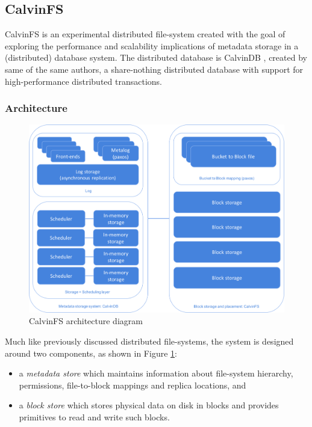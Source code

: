 \subsection{CalvinFS}
CalvinFS \cite{DBLP:conf/fast/ThomsonA15} is an experimental distributed file-system created with the goal of exploring the performance and scalability implications of metadata storage in a (distributed) database system.
The distributed database is CalvinDB \cite{DBLP:conf/sigmod/ThomsonDWRSA12}, created by same of the same authors, a share-nothing distributed database with support for high-performance distributed transactions.

\subsubsection{Architecture}
\begin{figure}[h]
\caption{CalvinFS architecture diagram}
\label{fig:calvin-block-diagram}
\centering
\includegraphics[width=1.0\textwidth]{images/calvin-block-diagram.png}
\end{figure}


Much like previously discussed distributed file-systems, the system is designed around two components, as shown in Figure \ref{fig:calvin-block-diagram}:
\begin{itemize}
    \item a \emph{metadata store} which maintains information about file-system hierarchy, permissions, file-to-block mappings and replica locations, and
    \item a \emph{block store} which stores physical data on disk in blocks and provides primitives to read and write such blocks.
\end{itemize}

